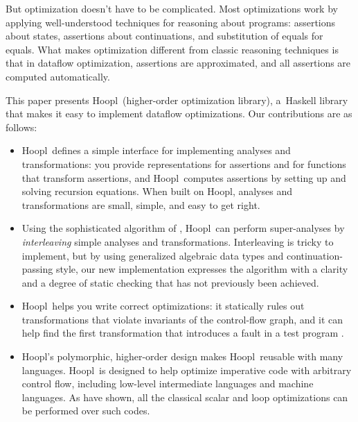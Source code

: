 \documentclass[blockstyle,preprint,natbib,nocopyrightspace]{sigplanconf}
\newcommand\ourlib{Hoopl}  %
\let\hoopl\ourlib
\let\cite\citep
\newcommand\secref[1]{Section~\ref{sec:#1}}
\begin{document}
But optimization doesn't have to be complicated.
Most optimizations
work by applying well-understood techniques for
reasoning about programs:
assertions about states, assertions about continuations, and
substitution of equals for equals.  %
What makes optimization different from classic reasoning techniques
is that in dataflow optimization, assertions are approximated,
and all assertions are computed automatically.

This paper presents \ourlib\ (higher-order optimization library), 
a~Haskell library that makes it easy to implement dataflow optimizations.
Our contributions are as follows:
\begin{itemize}
\item
\ourlib\ defines a simple interface for implementing analyses and transformations:
you provide representations for assertions and for functions that
transform assertions, 
and \ourlib\ computes assertions
 by setting up and solving recursion
equations.
When built on \ourlib, analyses and transformations
are small, simple, and easy to get right.
\item
Using the sophisticated algorithm of \citet{lerner-grove-chambers:2002},
\ourlib\ can perform super-analyses by \emph{interleaving}
simple analyses and transformations.
Interleaving is tricky to implement,
but by using 
generalized algebraic data types 
and continuation-passing style,
our new implementation expresses the algorithm with a clarity and a
degree of 
static checking that has not 
previously been achieved.
\item
\ourlib\ helps you write correct optimizations:
it
statically rules out transformations that violate invariants
of the control-flow graph,
and it can help find the first transformation that introduces a fault
in a test program \cite{whalley:isolation}.
\item
\ourlib's polymorphic, higher-order design makes \ourlib\ reusable
with many languages.
\hoopl\ is designed to help optimize imperative code
with arbitrary control flow,
including low-level intermediate languages and machine languages.
\ifcutting\else
As \citet{benitez-davidson:portable-optimizer} have shown, all the
classical scalar and loop optimizations can be performed over such
codes.
\fi
\end{itemize}
\end{document}
